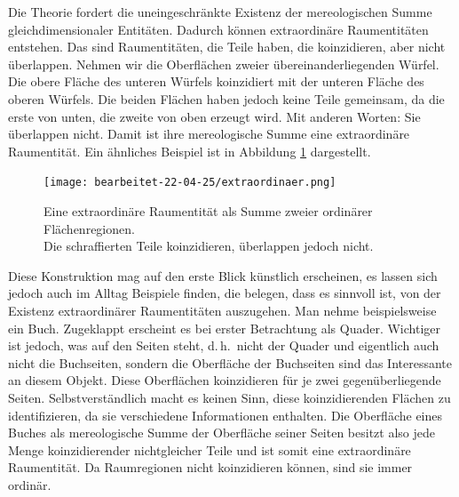 		Die Theorie fordert die uneingeschränkte Existenz der mereologischen Summe gleichdimensionaler Entitäten. Dadurch können extraordinäre Raumentitäten entstehen. Das sind Raumentitäten, die Teile haben, die koinzidieren, aber nicht überlappen.
		Nehmen wir die Oberflächen zweier übereinanderliegenden Würfel. 
		Die obere Fläche des unteren Würfels koinzidiert mit der unteren Fläche des oberen Würfels. Die beiden Flächen haben jedoch keine Teile gemeinsam, da die erste von unten, die zweite von oben erzeugt wird. 
		Mit anderen Worten: Sie überlappen nicht. Damit ist ihre mereologische Summe eine extraordinäre Raumentität.
		Ein ähnliches Beispiel ist in Abbildung \ref{fig:extraordinaer} dargestellt.
        \begin{figure}[ht]
            \centering
            \texttt{[image: bearbeitet-22-04-25/extraordinaer.png]}
            \caption[Eine extraordinäre Raumentität als Summe zweier ordinärer Flächenregionen]{Eine extraordinäre Raumentität als Summe zweier ordinärer Flächenregionen.\\
            Die schraffierten Teile koinzidieren, überlappen jedoch nicht.}
            \label{fig:extraordinaer}
        \end{figure}
		Diese Konstruktion mag auf den erste Blick künstlich erscheinen, es lassen sich jedoch auch im Alltag Beispiele finden, die belegen, dass es sinnvoll ist, von der Existenz extraordinärer Raumentitäten auszugehen. 
		Man nehme beispielsweise ein Buch. 
		Zugeklappt erscheint es bei erster Betrachtung als Quader. 
		Wichtiger ist jedoch, was auf den Seiten steht, d.\,h.\ nicht der Quader und eigentlich auch nicht die Buchseiten, sondern die Oberfläche der Buchseiten sind das Interessante an diesem Objekt. 
		Diese Oberflächen koinzidieren für je zwei gegenüberliegende Seiten.
		Selbstverständlich macht es keinen Sinn, diese koinzidierenden Flächen zu identifizieren, da sie verschiedene Informationen enthalten. 
		Die Oberfläche eines Buches als mereologische Summe der Oberfläche seiner Seiten besitzt also jede Menge koinzidierender nichtgleicher Teile und ist somit eine extraordinäre Raumentität.
		Da Raumregionen nicht koinzidieren können, sind sie immer ordinär.
		
		
		

